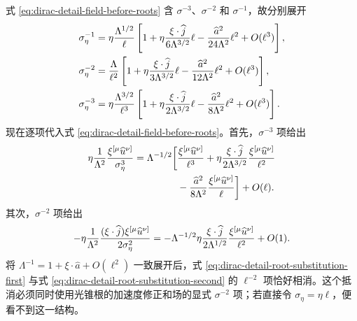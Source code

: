 式 \eqref{eq:dirac-detail-field-before-roots} 含 $\sigma^{-3}$、$\sigma^{-2}$ 和 $\sigma^{-1}$，故分别展开
\begin{align}
 \sigma_\eta^{-1}
 &=\eta{\Lambda^{1/2}\over\ell}
 \left[
 1+\eta{\xi\cdot \widehat j\over6\Lambda^{3/2}}\ell
 -{\widehat a^2\over24\Lambda^2}\ell^2
 +O(\ell^3)
 \right],
 \notag\\
 \sigma_\eta^{-2}
 &={\Lambda\over\ell^2}
 \left[
 1+\eta{\xi\cdot \widehat j\over3\Lambda^{3/2}}\ell
 -{\widehat a^2\over12\Lambda^2}\ell^2
 +O(\ell^3)
 \right],
 \notag\\
 \sigma_\eta^{-3}
 &=\eta{\Lambda^{3/2}\over\ell^3}
 \left[
 1+\eta{\xi\cdot \widehat j\over2\Lambda^{3/2}}\ell
 -{\widehat a^2\over8\Lambda^2}\ell^2
 +O(\ell^3)
 \right].
 \label{eq:dirac-detail-inverse-root-powers}
\end{align}
现在逐项代入式 \eqref{eq:dirac-detail-field-before-roots}。首先，$\sigma^{-3}$ 项给出
\begin{align}
 \eta{1\over\Lambda^2}
 {\xi^{[\mu}\widehat u^{\nu]}\over\sigma_\eta^3}
 =\Lambda^{-1/2}\bigg[
 &{\xi^{[\mu}\widehat u^{\nu]}\over\ell^3}
 +\eta{\xi\cdot \widehat j\over2\Lambda^{3/2}}
 {\xi^{[\mu}\widehat u^{\nu]}\over\ell^2}
 \notag\\
 &-{\widehat a^2\over8\Lambda^2}
 {\xi^{[\mu}\widehat u^{\nu]}\over\ell}
 \bigg]+O(\ell).
 \label{eq:dirac-detail-root-substitution-first}
\end{align}
其次，$\sigma^{-2}$ 项给出
\begin{align}
 -\eta{1\over\Lambda^2}
 {(\xi\cdot \widehat j)\xi^{[\mu}\widehat u^{\nu]}\over2\sigma_\eta^2}
 =-\Lambda^{-1/2}
 \eta{\xi\cdot \widehat j\over2\Lambda^{1/2}}
 {\xi^{[\mu}\widehat u^{\nu]}\over\ell^2}
 +O(1).
 \label{eq:dirac-detail-root-substitution-second}
\end{align}
将 $\Lambda^{-1}=1+\xi\cdot \widehat a+O(\ell^2)$ 一致展开后，式 \eqref{eq:dirac-detail-root-substitution-first} 与式 \eqref{eq:dirac-detail-root-substitution-second} 的 $\ell^{-2}$ 项恰好相消。这个抵消必须同时使用光锥根的加速度修正和场的显式 $\sigma^{-2}$ 项；若直接令 $\sigma_\eta=\eta\ell$，便看不到这一结构。

